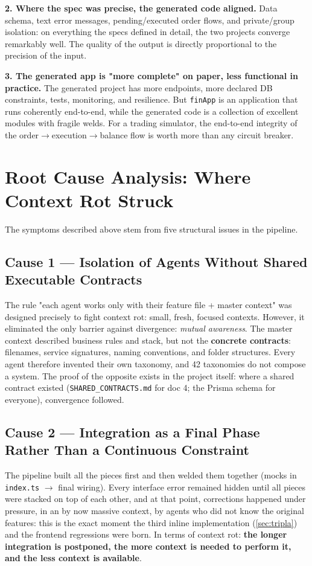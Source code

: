 \documentclass[11pt,a4paper]{article}
\newcommand{\file}[1]{\texttt{\small #1}}
\begin{document}
	\textbf{2. Where the spec was precise, the generated code aligned.} Data schema, text error messages, pending/executed order flows, and private/group isolation: on everything the specs defined in detail, the two projects converge remarkably well. The quality of the output is directly proportional to the precision of the input.
	
	\textbf{3. The generated app is "more complete" on paper, less functional in practice.} The generated project has more endpoints, more declared DB constraints, tests, monitoring, and resilience. But \file{finApp} is an application that runs coherently end-to-end, while the generated code is a collection of excellent modules with fragile welds. For a trading simulator, the end-to-end integrity of the order$\to$execution$\to$balance flow is worth more than any circuit breaker.
	
	\section{Root Cause Analysis: Where Context Rot Struck}
	
	The symptoms described above stem from five structural issues in the pipeline.
	
	\subsection{Cause 1 --- Isolation of Agents Without Shared Executable Contracts}
	The rule "each agent works only with their feature file + master context" was designed precisely to fight context rot: small, fresh, focused contexts. However, it eliminated the only barrier against divergence: \emph{mutual awareness}. The master context described business rules and stack, but not the \textbf{concrete contracts}: filenames, service signatures, naming conventions, and folder structures. Every agent therefore invented their own taxonomy, and 42 taxonomies do not compose a system. The proof of the opposite exists in the project itself: where a shared contract existed (\file{SHARED\_CONTRACTS.md} for doc 4; the Prisma schema for everyone), convergence followed.
	
	\subsection{Cause 2 --- Integration as a Final Phase Rather Than a Continuous Constraint}
	The pipeline built all the pieces first and then welded them together (mocks in \file{index.ts} $\to$ final wiring). Every interface error remained hidden until all pieces were stacked on top of each other, and at that point, corrections happened under pressure, in an by now massive context, by agents who did not know the original features: this is the exact moment the third inline implementation (\ref{sec:tripla}) and the frontend regressions were born. In terms of context rot: \textbf{the longer integration is postponed, the more context is needed to perform it, and the less context is available}.
	
\end{document}

